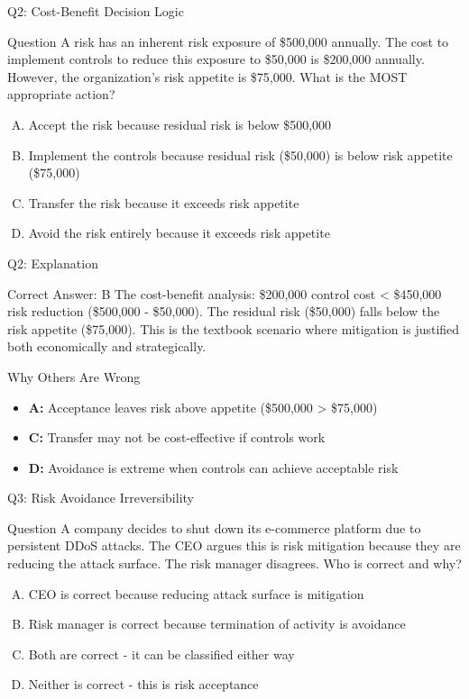 \documentclass{beamer}
\begin{document}
	\begin{frame}{Q2: Cost-Benefit Decision Logic}
		\begin{block}{Question}
			A risk has an inherent risk exposure of \$500,000 annually. The cost to implement controls to reduce this exposure to \$50,000 is \$200,000 annually. However, the organization's risk appetite is \$75,000. What is the MOST appropriate action?
		\end{block}
		\begin{enumerate}[(A)]
			\item Accept the risk because residual risk is below \$500,000
			\item Implement the controls because residual risk (\$50,000) is below risk appetite (\$75,000)
			\item Transfer the risk because it exceeds risk appetite
			\item Avoid the risk entirely because it exceeds risk appetite
		\end{enumerate}
	\end{frame}
	
	\begin{frame}{Q2: Explanation}
		\begin{block}{Correct Answer: B}
			The cost-benefit analysis: \$200,000 control cost < \$450,000 risk reduction (\$500,000 - \$50,000). The residual risk (\$50,000) falls below the risk appetite (\$75,000). This is the textbook scenario where mitigation is justified both economically and strategically.
		\end{block}
		\begin{block}{Why Others Are Wrong}
			\begin{itemize}
				\item \textbf{A:} Acceptance leaves risk above appetite (\$500,000 > \$75,000)
				\item \textbf{C:} Transfer may not be cost-effective if controls work
				\item \textbf{D:} Avoidance is extreme when controls can achieve acceptable risk
			\end{itemize}
		\end{block}
	\end{frame}
	
	\begin{frame}{Q3: Risk Avoidance Irreversibility}
		\begin{block}{Question}
			A company decides to shut down its e-commerce platform due to persistent DDoS attacks. The CEO argues this is risk mitigation because they are reducing the attack surface. The risk manager disagrees. Who is correct and why?
		\end{block}
		\begin{enumerate}[(A)]
			\item CEO is correct because reducing attack surface is mitigation
			\item Risk manager is correct because termination of activity is avoidance
			\item Both are correct - it can be classified either way
			\item Neither is correct - this is risk acceptance
		\end{enumerate}
	\end{frame}
	
\end{document}
